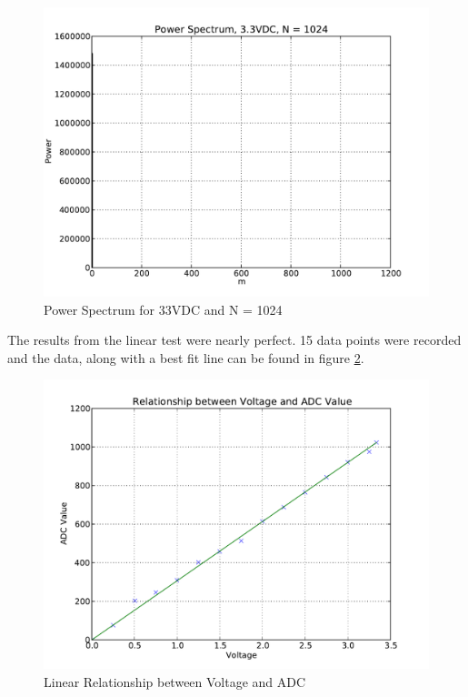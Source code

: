 \documentclass[10pt,conference]{IEEEtran}
\begin{document}
\begin{figure}[ht]
	\includegraphics[scale=.50]{power_spectrum_33_1024}
	\caption{Power Spectrum for 33VDC and N = 1024}\label{power_spectrum_33_1024}
\end{figure}

The results from the linear test were nearly perfect. 15 data points were recorded and the data, along with a best fit line can be found in figure \ref{linear_data}.

\begin{figure}[ht]
	\includegraphics[scale=.50]{linear_data}
	\caption{Linear Relationship between Voltage and ADC}\label{linear_data}
\end{figure}
\end{document}
